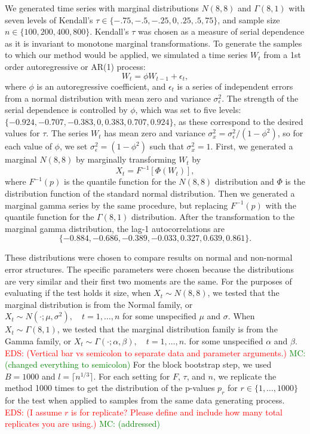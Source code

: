 \documentclass[APA,Times1COL]{WileyNJDv5} %
\newcommand{\eds}[1]{\textcolor{red}{EDS: (#1)}}
\newcommand{\mc}[1]{\textcolor{green}{MC: (#1)}}
\begin{document}
We generated time series with marginal distributions $N(8, 8)$ and
$\Gamma(8, 1)$ with seven levels of Kendall's
$\tau \in \{-.75, -.5, -.25, 0, .25, .5, 75\}$, and
sample size $n \in \{100, 200, 400, 800\}$. Kendall's $\tau$ was chosen as a
measure of serial dependence as it is invariant to monotone marginal
transformations. 
To generate the samples to which our
method would be applied, we simulated a time series $W_t$ from a 1st 
order autoregressive or AR(1) process:
\begin{equation*}
W_t = \phi W_{t-1} + \epsilon_t,
\end{equation*}
where $\phi$ is an autoregressive coefficient, and $\epsilon_t$ is a series of
independent errors from a normal distribution with mean zero and variance
$\sigma_{\epsilon}^2$. The strength of the serial dependence is controlled by
$\phi$, which was set to five levels: 
$\{-0.924, -0.707, -0.383, 0, 0.383, 0.707, 0.924\}$, as these
correspond to the desired values for $\tau$. The 
series $W_t$ has mean zero and variance 
$\sigma_x^2 = \sigma_{\epsilon}^2 / (1 - \phi^2)$, so for each value of
$\phi$,  we 
set $\sigma_{\epsilon}^2 = (1 - \phi^2)$ such that $\sigma_x^2 = 1$.
First, we generated a
marginal $N(8, 8)$ by marginally transforming $W_t$ by
\begin{equation*}
X_t = F^{-1}[\Phi(W_t)],
\end{equation*}
where $F^{-1}(p)$ is the quantile function for the $N(8, 8)$ 
distribution and $\Phi$ is the distribution function of the standard normal
distribution.
Then we generated a marginal gamma series by the same procedure, but
replacing $F^{-1}(p)$ with the quantile function for the $\Gamma(8, 1)$
distribution.
After the transformation
to the marginal gamma distribution, the lag-1 autocorrelations are
\[
  \{-0.884, -0.686, -0.389, -0.033, 0.327, 0.639, 0.861\}.
\]


These distributions
were chosen to compare results on normal and non-normal
error structures. The specific parameters were chosen because the distributions 
are very similar and their
first two moments are the same. 
For the purposes of 
evaluating if the test holds it size, when $X_t \sim N(8, 8)$, we tested that the 
marginal distribution is from the
Normal family, or 
$X_t \sim N(\cdot ; \mu, \sigma^2), \quad t = 1, \ldots, n$
for some unspecified $\mu$ and $\sigma$. When $X_t \sim \Gamma(8, 1)$, we tested
that the marginal distribution family is from the Gamma family,
or
$X_t \sim \Gamma(\cdot ; \alpha, \beta), \quad t = 1, \ldots, n$.
for some unspecified $\alpha$ and $\beta$.
\eds{Vertical bar vs semicolon to separate data and parameter arguments.}
\mc{changed everything to semicolon}
For the block
bootstrap step,
we used $B = 1000$ and $l = \lceil n^{1/3} \rceil$.
For each setting for $F$, $\tau$, and $n$, we replicate the method 1000 times 
to get the distribution of the p-values $p_r$ for
$r \in \{1, \dots, 1000\}$
for the test when applied to samples from the same data generating process.
\eds{I assume $r$ is for replicate?  Please define and include how many 
total replicates you are using.} \mc{addressed}
\end{document}
